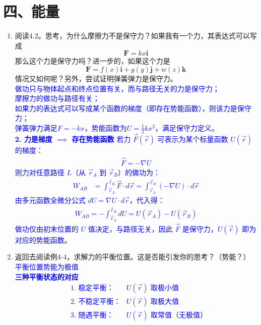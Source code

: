 \documentclass[12pt,a4paper]{article}
\begin{document}
\section{四、能量}
\begin{enumerate}[label=\arabic*.,leftmargin=*]
    \item 阅读4.2。思考，为什么摩擦力不是保守力？如果我有一个力，其表达式可以写成
    \[
    \boldsymbol{F}=kx\boldsymbol{i}
    \]
    那么这个力是保守力吗？进一步的，如果这个力是
    \[
    \boldsymbol{F}=f(x)\boldsymbol{i}+g(y)\boldsymbol{j}+w(z)\boldsymbol{k}
    \]
    情况又如何呢？另外，尝试证明弹簧弹力是保守力。\\
    \textcolor{blue}{
    做功只与物体起点和终点位置有关，而与路径无关的力是保守力；\\    
    摩擦力的做功与路径有关；\\
    如果力的表达式可以写成某个函数的梯度（即存在势能函数），则该力是保守力；\\
    弹簧弹力满足$F=-kx$，势能函数为$U=\frac{1}{2}kx^2$，满足保守力定义。\\
    \textbf{2. 力是梯度 $\implies$ 存在势能函数}
若力 $\vec{F}(\vec{r})$ 可表示为某个标量函数 $U(\vec{r})$ 的梯度：
\begin{align*}
\vec{F} = -\nabla U
\end{align*}
则力对任意路径 $L$（从 $\vec{r}_A$ 到 $\vec{r}_B$）的做功为：
\begin{align*}
W_{AB} &= \int_{\vec{r}_A}^{\vec{r}_B} \vec{F} \cdot d\vec{r} = \int_{\vec{r}_A}^{\vec{r}_B} (-\nabla U) \cdot d\vec{r}
\end{align*}
由多元函数全微分公式 $dU = \nabla U \cdot d\vec{r}$，代入得：
\begin{align*}
W_{AB} = -\int_{\vec{r}_A}^{\vec{r}_B} dU = U(\vec{r}_A) - U(\vec{r}_B)
\end{align*}
做功仅由初末位置的 $U$ 值决定，与路径无关，因此 $\vec{F}$ 是保守力，$U(\vec{r})$ 即为对应的势能函数。
    }

    \item 返回去阅读例4-4，求解力的平衡位置。这是否能引发你的思考？（势能？）
\textcolor{blue}{\\平衡位置势能为极值\\
\textbf{三种平衡状态的对应}
\begin{align*}
& \text{1. 稳定平衡：} & U(\vec{r}) \text{ 取极小值} \\
& \text{2. 不稳定平衡：} & U(\vec{r}) \text{ 取极大值} \\
& \text{3. 随遇平衡：} & U(\vec{r}) \text{ 取常值（无极值）}
\end{align*}}


\end{enumerate}
\end{document}

